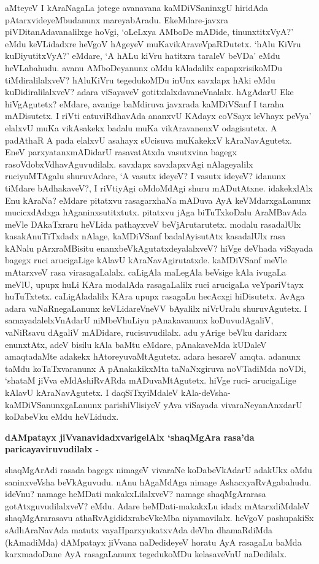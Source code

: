 \noindent
aMteyeV I kAraNagaLa jotege avanavana kaMDiVSaninxgU hiridAda pAtarx\-videyeMbudanunx mareya\-bAradu. EkeMdare-javxra piVDitanAdavanalilxge hoVgi, `oLeLxya AMboDe mADide, tinunx\-titxVyA?' eMdu keVLi\-dadxre heVgoV hAgeyeV muKavikAraveVpaRDutetx. `hAlu KiVru kuDiyutitxVyA?' eMdare, `A hALu kiVru hatitxra taraleV beVDa' eMdu heVLabahudu. avanu AMboDeyanunx oMdu kAladalilx capapx\-risikoMDu tiMdiralilalxveV? hAluKiVru tegedukoMDu inUnx savxlapx hAki eMdu kuDidiralilalxveV? adara viSayaveV gotitxlalxdavaneVnalalx. hAgAdarU Eke hiVgAgutetx? eMdare, avanige baMdiruva javxrada kaMDiVSanf I taraha mADisutetx. I riVti catuviRdhavAda ananxvU KAdayx coVSayx leVhayx peVya' elalxvU muKa vikAsakekx badalu muKa vikAravanenxV odagisutetx. A padAthaR A pada elalxvU asahayx\- sUci\-suva muKakekxV kAraNavAgutetx. EneV parxyatanxmADidarU rasavatAtxda vasutxvina bagegx rasoVdobxVdhavAgu\-vudilalx. savxlapx savxlapxvAgi nAlageyalilx ruciyuMTAgalu shuruvAdare, `A vasutx ideyeV? I vasutx ideyeV? idanunx tiMdare bAdhakaveV?, I riVtiyAgi oMdoMdAgi shuru mADutAtxne. idakekxlAlx Enu kAraNa? eMdare pitatxvu rasagarxhaNa mADuva AyA keVMdarxgaLanunx mucicxdAdxga hAganinxsutitxtutx. pitatxvu jAga biTuTxkoDalu AraMBavAda meVle DAkaTxraru heVLida pathayxveV beVjArutarutetx. modalu rasadalUlx kasakAnuTiTxdadx nAlage, kaMDiVSanf badalAyisutAtx kasadalUlx rasa kANalu pArxraMBisitu enanxbeVkAgutatxde\-yalalxveV? hiVge deVhada viSayada bagegx ruci arucigaLige kAlavU kAraNavAgirutatxde. kaMDiVSanf meVle mAtarxveV rasa virasagaLalalx. caLigAla maLegAla beVsige kAla ivugaLa meVlU, upupx huLi KAra moda\-lAda rasagaLalilx ruci arucigaLa veYpariVtayx huTuTxtetx. caLigAladalilx KAra upupx rasagaLu hecAcxgi hiDi\-sutetx. AvAga adara vaNaRnegaLanunx keVLidareVneVV bAyalilx niVrUralu shuruvAgutetx. I samayadalelxV\-nAdarU niMbeVhuLiyu pAnakavanunx koDuvudAgaliV, vaNiRsavu dAgaliV mADidare, rucisuvu\-dilalx. adu yArige beVku daridarx enunxtAtx, adeV bisilu kAla baMtu eMdare, pAnakaveMda kUDaleV amaqtadaMte adakekx hAtoreyuvaMtAgutetx. adara hesareV amqta. adanunx taMdu koTaTxva\-ranunx A pAnakakikxMta taNaNxgiruva noVTadiMda noVDi, `shataM jiVva eMdAshiRvARda mADuvaMtAgutetx. hiVge ruci- arucigaLige kAlavU kAraNavAgutetx. I daqSiTxyiMdaleV kAla-deVsha-kaMDiVSanunxgaLanunx parishiVlisiyeV yAva viSayada vivaraNeyanAnxdarU koDabeVku eMdu heVLidudx.

{\bigskip
\noindent
{\large\bf dAMpatayx jiVvanavidadxvarigelAlx `shaqMgAra rasa'da paricayaviruvudilalx -}}\label{page221}
\medskip

\noindent
shaqMgArAdi rasada bagegx nimageV vivaraNe koDabeVkAdarU adakUkx oMdu saninx\-veVsha beVkAgu\-vudu. nAnu hAgaMdAga nimage AshacxyaRvAgabahudu. ideVnu? namage heMDati makakxLilalxveV? namage shaqMgArarasa gotAtxguvudilalxveV? eMdu. Adare heMDati-makakxLu idadx mAtarxdiMdaleV shaqMgArarasavu athaRvAgididxrabeVkeMba niyamavilalx. heVgoV pashupakiSx sAdhAraNavAda matutx vayaH\-parxyukatxvAda \hbox{deVha} dhamaRdiMda (kAmadiMda) dAMpatayx jiVvana naDedideyeV horatu AyA rasagaLu baMda karxmadoDane AyA rasagaLanunx tegedukoMDu kelasaveVnU naDedilalx.

